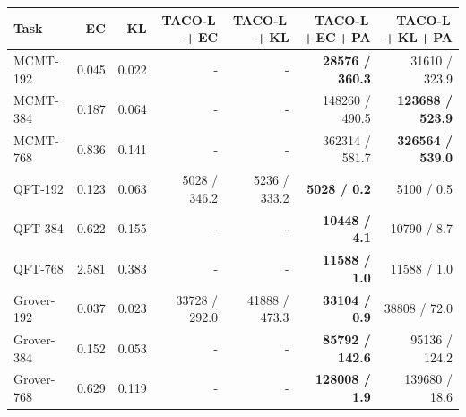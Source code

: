 \begin{tabular}{lrrrrrr}
\hline
Task & EC & KL & TACO-L\,+\,EC & TACO-L\,+\,KL & TACO-L\,+\,EC\,+\,PA & TACO-L\,+\,KL\,+\,PA \\
\hline
MCMT-192 & 0.045 & 0.022 & - & - & \textbf{28576 / 360.3} & 31610 / 323.9 \\
MCMT-384 & 0.187 & 0.064 & - & - & 148260 / 490.5 & \textbf{123688 / 523.9} \\
MCMT-768 & 0.836 & 0.141 & - & - & 362314 / 581.7 & \textbf{326564 / 539.0} \\
QFT-192 & 0.123 & 0.063 & 5028 / 346.2 & 5236 / 333.2 & \textbf{5028 / 0.2} & 5100 / 0.5 \\
QFT-384 & 0.622 & 0.155 & - & - & \textbf{10448 / 4.1} & 10790 / 8.7 \\
QFT-768 & 2.581 & 0.383 & - & - & \textbf{11588 / 1.0} & 11588 / 1.0 \\
Grover-192 & 0.037 & 0.023 & 33728 / 292.0 & 41888 / 473.3 & \textbf{33104 / 0.9} & 38808 / 72.0 \\
Grover-384 & 0.152 & 0.053 & - & - & \textbf{85792 / 142.6} & 95136 / 124.2 \\
Grover-768 & 0.629 & 0.119 & - & - & \textbf{128008 / 1.9} & 139680 / 18.6 \\
\hline
\end{tabular}
